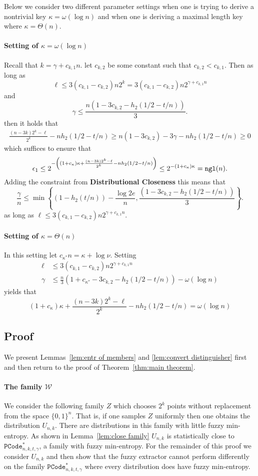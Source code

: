 Below we consider two different parameter settings when one is trying to derive a nontrivial key $\kappa = \omega(\log n)$ and when one is deriving a maximal length key where $\kappa = \Theta(n)$.
\paragraph{Setting of $\kappa =\omega(\log n)$} 
Recall that $k = \gamma+c_{k,1}n$. let $c_{k,2}$ be some constant such that $c_{k,2}<c_{k,1}$. Then as long as
\[
\ell\le 3(c_{k,1}-c_{k,2}) n2^k= 3(c_{k,1}-c_{k,2})n2^{\gamma+c_{k,1}n}
\]
and 
\[
\gamma \le \frac{n(1-3c_{k,2} - h_2(1/2-t/n))}{3}.
\]
 then it holds that 
\begin{align*}
\frac{(n-3k)2^k-\ell}{2^k} - nh_2(1/2-t/n) 
\ge n(1-3c_{k,2}) - 3\gamma - nh_2(1/2-t/n) \ge 0
\end{align*}
which suffices to ensure that 
\[
\epsilon_1 \le   2^{-\left((1+c_{\kappa})\kappa+\frac{(n-3k)2^k-\ell}{2^k} - nh_2(1/2-t/n) \right)} \le  2^{-(1+c_{\kappa})\kappa} = \mathtt{ngl}(n).
\]
\noindent
Adding the constraint from \textbf{Distributional Closeness}
this means that 
\[
\frac{\gamma}{n} \le \min\left\{(1-h_2(t/n)) - \frac{\log{2e}}{n}, \frac{(1-3c_{k,2} - h_2(1/2-t/n))}{3}\right\}.
\]
as long as $\ell\le 3(c_{k,1}-c_{k,2})n2^{\gamma+c_{k,1}n}.$

\paragraph{Setting of $\kappa = \Theta(n)$}
In this setting let $c_{\kappa^*} n = \kappa+\log{\nu}$.  Setting 
\begin{align*}
\ell&\le  3(c_{k,1}-c_{k,2})n2^{\gamma+c_{k,1}n}\\
\gamma&\le \frac{n}{3}\left(1+c_{\kappa^*} -3c_{k,2}-h_2(1/2-t/n)\right) - \omega(\log{n})
\end{align*}
yields that \[ (1+c_{\kappa})\kappa+\frac{(n-3k)2^k-\ell}{2^k} - nh_2(1/2-t/n) = \omega(\log n)\] 
\subsection{Proof}
\noindent
We present Lemmas~\ref{lem:entr of members} and \ref{lem:convert distinguisher} first and then return to the proof of Theorem~\ref{thm:main theorem}.


\paragraph{The family $\mathcal{W}$}
We consider the following family $Z$ which chooses $2^k$ points without replacement from the space $\{0,1\}^n$.  That is, if one samples $Z$ uniformly then one obtains the distribution $U_{n,k}$. There are distributions in this family with little fuzzy min-entropy.  As shown in Lemma~\ref{lem:close family} $U_{n,k}$  is statistically close to $\mathtt{PCode}_{n, k, t, \gamma}^{*}$, a family with fuzzy min-entropy.  For the remainder of this proof we consider $U_{n,k}$ and then show that the fuzzy extractor cannot perform differently on the family $\mathtt{PCode}_{n, k, t, \gamma}^{*}$ where every distribution does have fuzzy min-entropy. 

